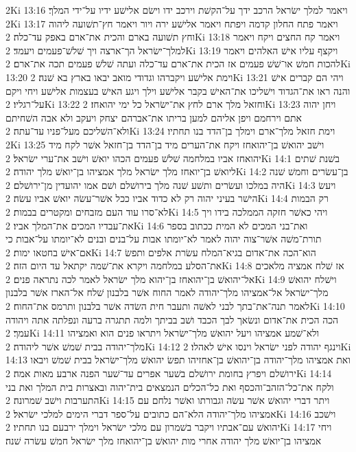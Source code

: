 2Ki 13:16  ויאמר למלך ישׂראל הרכב ידך על־הקשׁת וירכב ידו וישׂם אלישׁע ידיו על־ידי המלך׃
2Ki 13:17  ויאמר פתח החלון קדמה ויפתח ויאמר אלישׁע ירה ויור ויאמר חץ־תשׁועה ליהוה וחץ תשׁועה בארם והכית את־ארם באפק עד־כלה׃
2Ki 13:18  ויאמר קח החצים ויקח ויאמר למלך־ישׂראל הך־ארצה ויך שׁלשׁ־פעמים ויעמד׃
2Ki 13:19  ויקצף עליו אישׁ האלהים ויאמר להכות חמשׁ או־שׁשׁ פעמים אז הכית את־ארם עד־כלה ועתה שׁלשׁ פעמים תכה את־ארם׃
2Ki 13:20  וימת אלישׁע ויקברהו וגדודי מואב יבאו בארץ בא שׁנה׃
2Ki 13:21  ויהי הם קברים אישׁ והנה ראו את־הגדוד וישׁליכו את־האישׁ בקבר אלישׁע וילך ויגע האישׁ בעצמות אלישׁע ויחי ויקם על־רגליו׃
2Ki 13:22  וחזאל מלך ארם לחץ את־ישׂראל כל ימי יהואחז׃
2Ki 13:23  ויחן יהוה אתם וירחמם ויפן אליהם למען בריתו את־אברהם יצחק ויעקב ולא אבה השׁחיתם ולא־השׁליכם מעל־פניו עד־עתה׃
2Ki 13:24  וימת חזאל מלך־ארם וימלך בן־הדד בנו תחתיו׃
2Ki 13:25  וישׁב יהואשׁ בן־יהואחז ויקח את־הערים מיד בן־הדד בן־חזאל אשׁר לקח מיד יהואחז אביו במלחמה שׁלשׁ פעמים הכהו יואשׁ וישׁב את־ערי ישׂראל׃
2Ki 14:1  בשׁנת שׁתים ליואשׁ בן־יואחז מלך ישׂראל מלך אמציהו בן־יואשׁ מלך יהודה׃
2Ki 14:2  בן־עשׂרים וחמשׁ שׁנה היה במלכו ועשׂרים ותשׁע שׁנה מלך בירושׁלם ושׁם אמו יהועדין מן־ירושׁלם׃
2Ki 14:3  ויעשׂ הישׁר בעיני יהוה רק לא כדוד אביו ככל אשׁר־עשׂה יואשׁ אביו עשׂה׃
2Ki 14:4  רק הבמות לא־סרו עוד העם מזבחים ומקטרים בבמות׃
2Ki 14:5  ויהי כאשׁר חזקה הממלכה בידו ויך את־עבדיו המכים את־המלך אביו׃
2Ki 14:6  ואת־בני המכים לא המית ככתוב בספר תורת־משׁה אשׁר־צוה יהוה לאמר לא־יומתו אבות על־בנים ובנים לא־יומתו על־אבות כי אם־אישׁ בחטאו ימות׃
2Ki 14:7  הוא־הכה את־אדום בגיא־המלח עשׂרת אלפים ותפשׂ את־הסלע במלחמה ויקרא את־שׁמה יקתאל עד היום הזה׃
2Ki 14:8  אז שׁלח אמציה מלאכים אל־יהואשׁ בן־יהואחז בן־יהוא מלך ישׂראל לאמר לכה נתראה פנים׃
2Ki 14:9  וישׁלח יהואשׁ מלך־ישׂראל אל־אמציהו מלך־יהודה לאמר החוח אשׁר בלבנון שׁלח אל־הארז אשׁר בלבנון לאמר תנה־את־בתך לבני לאשׁה ותעבר חית השׂדה אשׁר בלבנון ותרמס את־החוח׃
2Ki 14:10  הכה הכית את־אדום ונשׂאך לבך הכבד ושׁב בביתך ולמה תתגרה ברעה ונפלתה אתה ויהודה עמך׃
2Ki 14:11  ולא־שׁמע אמציהו ויעל יהואשׁ מלך־ישׂראל ויתראו פנים הוא ואמציהו מלך־יהודה בבית שׁמשׁ אשׁר ליהודה׃
2Ki 14:12  וינגף יהודה לפני ישׂראל וינסו אישׁ לאהלו׃
2Ki 14:13  ואת אמציהו מלך־יהודה בן־יהואשׁ בן־אחזיהו תפשׂ יהואשׁ מלך־ישׂראל בבית שׁמשׁ ויבאו ירושׁלם ויפרץ בחומת ירושׁלם בשׁער אפרים עד־שׁער הפנה ארבע מאות אמה׃
2Ki 14:14  ולקח את־כל־הזהב־והכסף ואת כל־הכלים הנמצאים בית־יהוה ובאצרות בית המלך ואת בני התערבות וישׁב שׁמרונה׃
2Ki 14:15  ויתר דברי יהואשׁ אשׁר עשׂה וגבורתו ואשׁר נלחם עם אמציהו מלך־יהודה הלא־הם כתובים על־ספר דברי הימים למלכי ישׂראל׃
2Ki 14:16  וישׁכב יהואשׁ עם־אבתיו ויקבר בשׁמרון עם מלכי ישׂראל וימלך ירבעם בנו תחתיו׃
2Ki 14:17  ויחי אמציהו בן־יואשׁ מלך יהודה אחרי מות יהואשׁ בן־יהואחז מלך ישׂראל חמשׁ עשׂרה שׁנה׃
